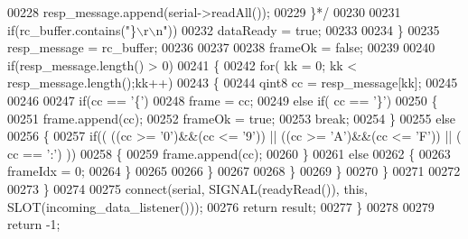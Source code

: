 \begin{DoxyCode}
{{{{{{{{{{{{{{{00228 \textcolor{comment}{                        resp\_message.append(serial->readAll());}
00229 \textcolor{comment}{                       \}*/}
00230 
00231                        \textcolor{keywordflow}{if}(rc\_buffer.contains(\textcolor{stringliteral}{"\}\(\backslash\)r\(\backslash\)n"}))
00232                            dataReady = \textcolor{keyword}{true};
00233 
00234                    \}
00235                     resp\_message = rc\_buffer;
00236 
00237 
00238                    frameOk = \textcolor{keyword}{false};
00239 
00240                    \textcolor{keywordflow}{if}(resp\_message.length() > 0)
00241                    \{
00242                         \textcolor{keywordflow}{for}( kk = 0; kk < resp\_message.length();kk++)
00243                         \{
00244                             qint8 cc = resp\_message[kk];
00245 
00246 
00247                             \textcolor{keywordflow}{if}(cc == \textcolor{charliteral}{'\{'})
00248                                 frame = cc;
00249                             \textcolor{keywordflow}{else} \textcolor{keywordflow}{if}( cc == \textcolor{charliteral}{'\}'})
00250                             \{
00251                                         frame.append(cc);
00252                                         frameOk = \textcolor{keyword}{true};
00253                                         \textcolor{keywordflow}{break};
00254                             \}
00255                             \textcolor{keywordflow}{else}
00256                             \{
00257                                          \textcolor{keywordflow}{if}(( ((cc >= \textcolor{charliteral}{'0'})&&(cc <= \textcolor{charliteral}{'9'})) || ((cc >= \textcolor{charliteral}{'A'})&&(cc <= \textcolor{charliteral}{'F'})) || (
       cc == \textcolor{charliteral}{':'}) ))
00258                                          \{
00259                                              frame.append(cc);
00260                                          \}
00261                                          \textcolor{keywordflow}{else}
00262                                          \{
00263                                              frameIdx = 0;
00264                                          \}
00265 
00266                              \}
00267 
00268                        \}
00269                   \}
00270              \}
00271 
00272 
00273    \}
00274 
00275       connect(serial, SIGNAL(readyRead()), \textcolor{keyword}{this}, SLOT(incoming\_data\_listener()));
00276       \textcolor{keywordflow}{return} result;
00277 \}
00278 
00279    \textcolor{keywordflow}{return} -1;
}}}}}}}}}}}}}}}
\end{DoxyCode}
